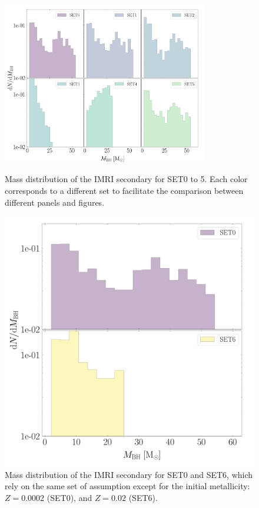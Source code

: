 \documentclass[article]{aa}
\newcommand{\Ms}{{\rm M}_\odot}
\begin{document}
{\begin{figure}
\centering
\includegraphics[width=0.8\textwidth]{massdis}\\
    \caption{%
    Mass distribution of the IMRI secondary for SET0 to 5. Each color corresponds to a different set to facilitate the comparison between different panels and figures. 
    }
	\label{fig:f8}
\end{figure}

\begin{figure}
\includegraphics[width=\columnwidth]{massdis06}
    \caption{Mass distribution of the IMRI secondary for SET0 and SET6, which rely on the same set of assumption except for the initial metallicity: $Z = 0.0002$ (SET0), and $Z = 0.02$ (SET6).}
	\label{fig:mbhdist}
\end{figure}


}
\end{document}
